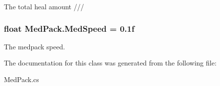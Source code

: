 The total heal amount /// 

\hypertarget{classMedPack_a054a06495e6562f93eaeefed24d1d474}{
\subsubsection[{Med\-Speed}]{\setlength{\rightskip}{0pt plus 5cm}float Med\-Pack.\-Med\-Speed = 0.\-1f}}\label{classMedPack_a054a06495e6562f93eaeefed24d1d474}


The medpack speed. 



The documentation for this class was generated from the following file\-:\begin{DoxyCompactItemize}
\item 
Med\-Pack.\-cs\end{DoxyCompactItemize}
